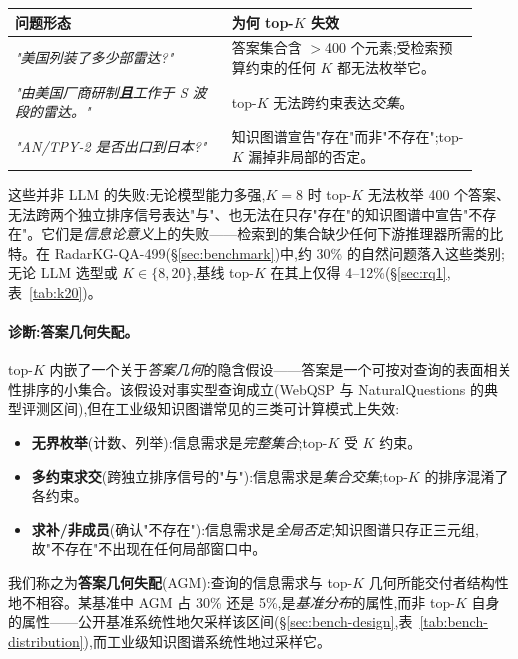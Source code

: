 \documentclass[11pt,a4paper]{article}
\begin{document}
\begin{table}[h]
\centering\small
\begin{tabular}{p{0.43\linewidth}|p{0.49\linewidth}}
\toprule
\textbf{问题形态} & \textbf{为何 top-$K$ 失效} \\
\midrule
\emph{"美国列装了多少部雷达?"} & 答案集合含 $>$400 个元素;受检索预算约束的任何 $K$ 都无法枚举它。 \\
\emph{"由美国厂商研制\textbf{且}工作于 S 波段的雷达。"} & top-$K$ 无法跨约束表达\emph{交集}。 \\
\emph{"AN/TPY-2 是否出口到日本?"} & 知识图谱宣告"存在"而非"不存在";top-$K$ 漏掉非局部的否定。 \\
\bottomrule
\end{tabular}
\end{table}

这些并非 LLM 的失败:无论模型能力多强,$K{=}8$ 时 top-$K$ 无法枚举 400 个答案、无法跨两个独立排序信号表达"与"、也无法在只存"存在"的知识图谱中宣告"不存在"。它们是\emph{信息论意义}上的失败——检索到的集合缺少任何下游推理器所需的比特。在 RadarKG-QA-499(\S\ref{sec:benchmark})中,约 30\% 的自然问题落入这些类别;无论 LLM 选型或 $K \in \{8, 20\}$,基线 top-$K$ 在其上仅得 4--12\%(\S\ref{sec:rq1},表~\ref{tab:k20})。

\paragraph{诊断:答案几何失配。}
top-$K$ 内嵌了一个关于\emph{答案几何}的隐含假设——答案是一个可按对查询的表面相关性排序的小集合。该假设对事实型查询成立(WebQSP 与 NaturalQuestions 的典型评测区间),但在工业级知识图谱常见的三类可计算模式上失效:
\begin{itemize}[topsep=0pt,itemsep=0pt,leftmargin=*]
  \item \textbf{无界枚举}(计数、列举):信息需求是\emph{完整集合};top-$K$ 受 $K$ 约束。
  \item \textbf{多约束求交}(跨独立排序信号的"与"):信息需求是\emph{集合交集};top-$K$ 的排序混淆了各约束。
  \item \textbf{求补/非成员}(确认"不存在"):信息需求是\emph{全局否定};知识图谱只存正三元组,故"不存在"不出现在任何局部窗口中。
\end{itemize}
我们称之为\textbf{答案几何失配}(AGM):查询的信息需求与 top-$K$ 几何所能交付者结构性地不相容。某基准中 AGM 占 30\% 还是 5\%,是\emph{基准分布}的属性,而非 top-$K$ 自身的属性——公开基准系统性地欠采样该区间(\S\ref{sec:bench-design},表~\ref{tab:bench-distribution}),而工业级知识图谱系统性地过采样它。
\end{document}
